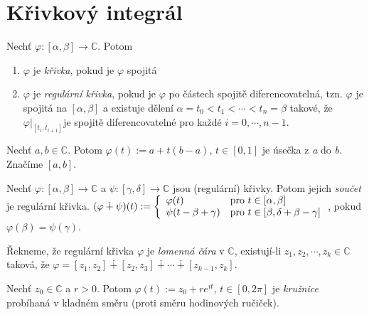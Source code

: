 \section{\texorpdfstring{Křivkový integrál}{Krivkový integrál}}

\begin{definition}
Nechť $\varphi:[\alpha,\beta] \rightarrow \mathbb{C}$. Potom
\begin{enumerate}
    \item $\varphi$ je \emph{křivka}, pokud je $\varphi$ spojitá
    \item $\varphi$ je \emph{regulární křivka}, pokud je $\varphi$ po částech spojitě diferencovatelná, tzn. $\varphi$ je spojitá na $[\alpha,\beta]$ a existuje dělení $\alpha = t_0<t_1<\cdots <t_n=\beta$ takové, že
    $\varphi \big\rvert
     _{[t_i,t_{i+1}]} 
    $je spojitě diferencovatelné pro každé $i=0,\cdots,n-1$.
    
\end{enumerate}
\end{definition}

\begin{definition}[Úsečka]
Nechť $a, b \in \mathbb{C}$. Potom $\varphi(t):= a + t(b-a)$, $ t \in [0,1]$ je úsečka z \emph{a} do \emph{b}. Značíme $[a,b]$.
\end{definition}

\begin{notation}
Nechť $\varphi:[\alpha,\beta]\rightarrow\mathbb{C}$ a $\psi:[\gamma,\delta]\rightarrow\mathbb{C}$ jsou (regulární) křivky. Potom jejich \emph{součet} je regulární křivka.
$(\varphi \dotplus \psi)(t) := 
\left\{ \begin{array}{ll}  \varphi(t)  & \mbox{pro } t \in[\alpha,\beta] \\ \psi(t-\beta+\gamma) & \mbox{pro } t \in[\beta,\delta+\beta-\gamma] \end{array} \right.$, pokud $\varphi(\beta)=\psi(\gamma)$.
\end{notation}

\begin{definition}
Řekneme, že regulární křivka $\varphi$ je \emph{lomenná čára} v $\mathbb{C}$, existují-li $z_1,z_2,\cdots,z_k \in \mathbb{C}$ taková, že $\varphi=[z_1,z_2]\dotplus[z_2,z_3]\dotplus\cdots\dotplus[z_{k-1},z_k]$.
\end{definition}


\begin{definition}[Kružnice]
Nechť $z_0\in\mathbb{C}$ a $r>0$. Potom $\varphi(t):=z_0+re^{it}$, $t\in [0,2\pi]$ je \emph{kružnice} probíhaná v kladném směru (proti směru hodinových ručiček).
\end{definition}

